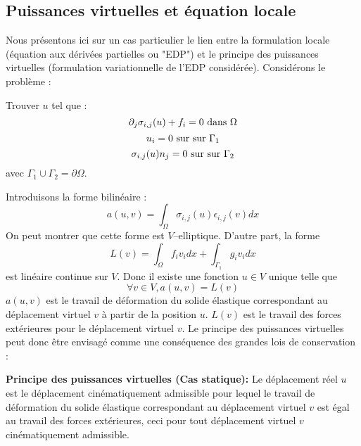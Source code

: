 \documentclass[12pt]{book}
\begin{document}
\subsection{Puissances virtuelles et \'equation locale}\label{sepripuiva}
Nous pr\'esentons ici sur un cas particulier le lien entre la formulation
locale (\'equation aux d\'eriv\'ees partielles ou "EDP") et le principe des
puissances virtuelles (formulation variationnelle de 
l'EDP consid\'er\'ee).
Consid\'erons le probl\`eme :
\begin{prob}
Trouver $u$ tel que :
\begin{equation}
\partial_j\sigma_{i,j}(u)+f_i=0\ {\rm dans}\ \Omega
\end{equation}
\begin{equation}
u_i=0\ {\rm sur}\ {\rm sur}\ \Gamma_1
\end{equation}
\begin{equation}
\sigma_{i,j}(u)n_j=0\ {\rm sur}\ {\rm sur}\ \Gamma_2
\end{equation}
avec $\Gamma_1\cup\Gamma_2=\partial\Omega$.
\end{prob}
Introduisons la forme bilin\'eaire :
\begin{equation}
a(u,v)=\int_\Omega \sigma_{i,j}(u)\epsilon_{i,j}(v)dx
\end{equation}
On peut montrer que cette forme est $V$--elliptique.
D'autre part, la forme 
\begin{equation}
L(v)=\int_\Omega
f_iv_idx+\int_{\Gamma_1}g_iv_idx
\end{equation}
 est lin\'eaire continue sur $V$.
Donc il existe une fonction $u\in V$ unique telle que 
\begin{equation}
\forall v\in V, a(u,v)=L(v)
\end{equation}
$a(u,v)$ est  le travail de d\'eformation du solide 
\'elastique correspondant au d\'eplacement
virtuel $v$ \`a partir de 
la position $u$.
$L(v)$ est le travail des forces ext\'erieures pour le d\'eplacement
virtuel $v$.
Le principe des puissances virtuelles peut donc \^etre envisag\'e comme une
cons\'equence des grandes lois de conservation :
\begin{prin}{\bf Principe des puissances virtuelles (Cas statique):}
Le d\'eplacement r\'eel $u$ est le d\'eplacement cin\'ematiquement
admissible pour lequel le travail de d\'eformation du solide
\'elastique correspondant au d\'eplacement virtuel $v$ est \'egal au
travail des forces ext\'erieures, ceci pour tout d\'eplacement virtuel
$v$ cin\'ematiquement admissible.
\end{prin}
\end{document}
